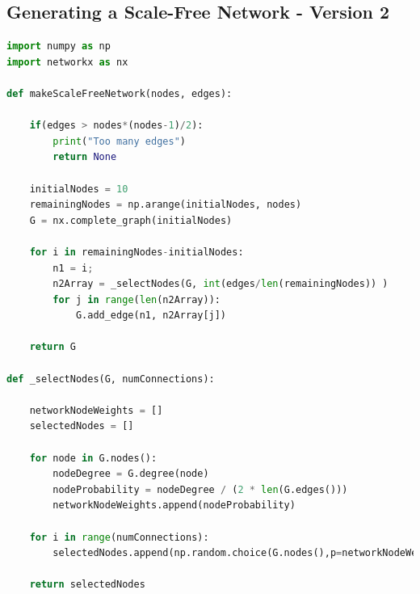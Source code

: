 \documentclass[journal]{IEEEtran}
\begin{document}
\subsection{Generating a Scale-Free Network - Version 2}
\begin{lstlisting}[language=Python]
import numpy as np
import networkx as nx

def makeScaleFreeNetwork(nodes, edges):

    if(edges > nodes*(nodes-1)/2):
        print("Too many edges")
        return None

    initialNodes = 10
    remainingNodes = np.arange(initialNodes, nodes)
    G = nx.complete_graph(initialNodes)

    for i in remainingNodes-initialNodes:
        n1 = i;
        n2Array = _selectNodes(G, int(edges/len(remainingNodes)) )
        for j in range(len(n2Array)):
            G.add_edge(n1, n2Array[j])

    return G

def _selectNodes(G, numConnections):

    networkNodeWeights = []
    selectedNodes = []

    for node in G.nodes():
        nodeDegree = G.degree(node)
        nodeProbability = nodeDegree / (2 * len(G.edges()))
        networkNodeWeights.append(nodeProbability)

    for i in range(numConnections):
        selectedNodes.append(np.random.choice(G.nodes(),p=networkNodeWeights))

    return selectedNodes
\end{lstlisting}
\end{document}
